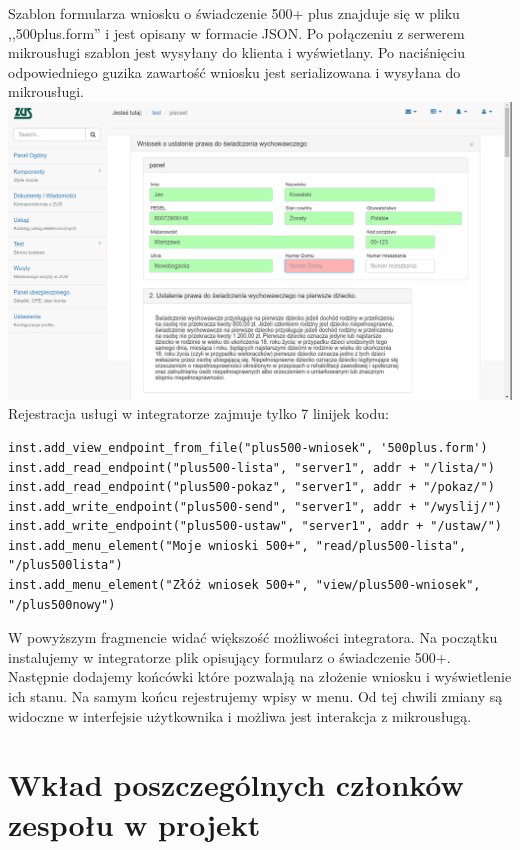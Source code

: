 \documentclass[licencjacka]{pracamgr}
\begin{document}
Szablon formularza wniosku o świadczenie 500+ plus znajduje się w pliku ,,500plus.form''
i jest opisany w formacie JSON. Po połączeniu z serwerem mikrousługi szablon jest
wysyłany do klienta i wyświetlany. Po naciśnięciu odpowiedniego guzika zawartość
wniosku jest serializowana i wysyłana do mikrousługi.\\
\includegraphics[width=\textwidth]{obrazki/piecset.png}
Rejestracja usługi w integratorze zajmuje tylko 7 linijek kodu:
\begin{verbatim}
inst.add_view_endpoint_from_file("plus500-wniosek", '500plus.form')
inst.add_read_endpoint("plus500-lista", "server1", addr + "/lista/")
inst.add_read_endpoint("plus500-pokaz", "server1", addr + "/pokaz/")
inst.add_write_endpoint("plus500-send", "server1", addr + "/wyslij/")
inst.add_write_endpoint("plus500-ustaw", "server1", addr + "/ustaw/")
inst.add_menu_element("Moje wnioski 500+", "read/plus500-lista", "/plus500lista")
inst.add_menu_element("Złóż wniosek 500+", "view/plus500-wniosek", "/plus500nowy")
\end{verbatim}
W powyższym fragmencie widać większość możliwości integratora. Na początku
instalujemy w integratorze plik opisujący formularz o świadczenie 500+. Następnie
dodajemy końcówki które pozwalają na złożenie wniosku i wyświetlenie ich stanu. Na
samym końcu rejestrujemy wpisy w menu. Od tej chwili zmiany są widoczne w interfejsie
użytkownika i możliwa jest interakcja z mikrousługą.

\chapter{Wkład poszczególnych członków zespołu w projekt}
\end{document}
